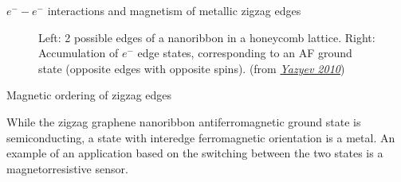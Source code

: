 \documentclass{beamer}
\begin{document}
\begin{frame}{$e^- - e^-$ interactions and magnetism of metallic zigzag edges}
\begin{figure}[ht!]
\begin{minipage}[c]{0.1\textwidth}
\end{minipage}
 \caption{Left: 2 possible edges of a nanoribbon in a honeycomb lattice. Right: Accumulation of $e^-$ edge states, corresponding to an AF ground state (opposite edges with opposite spins). (from 
    \href{https://arxiv.org/pdf/1004.2034.pdf}{\emph{Yazyev 2010}})}
\end{figure}

\end{frame}

\begin{frame}{Magnetic ordering of zigzag edges}

While the zigzag graphene nanoribbon antiferromagnetic ground state is semiconducting, a state with interedge ferromagnetic orientation is a metal. An example of an application based on the switching between the two states is a magnetorresistive sensor.


\end{frame}
\end{document}
